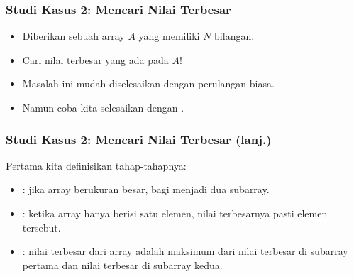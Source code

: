 %  
%    
%    
%

\begin{frame}
\frametitle{Studi Kasus 2: Mencari Nilai Terbesar}
\begin{itemize}
  \item Diberikan sebuah array $A$ yang memiliki $N$ bilangan.
  \item Cari nilai terbesar yang ada pada $A$!\newline
  \item Masalah ini mudah diselesaikan dengan perulangan biasa.
  \item Namun coba kita selesaikan dengan .\end{itemize}
\end{frame}

\begin{frame}
\frametitle{Studi Kasus 2: Mencari Nilai Terbesar (lanj.)}
Pertama kita definisikan tahap-tahapnya:
\begin{itemize}
  \item {}: jika array berukuran besar, bagi menjadi dua subarray.
  \item {}: ketika array hanya berisi satu elemen, nilai terbesarnya pasti elemen tersebut.
  \item {}: nilai terbesar dari array adalah maksimum dari nilai terbesar di subarray pertama dan nilai terbesar di subarray kedua.
\end{itemize}
\end{frame}

